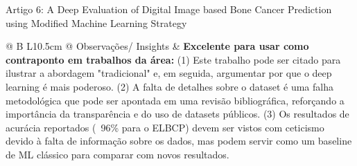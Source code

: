 \documentclass[12pt, a4paper]{article}
\begin{document}
\begin{fichabox}{Artigo 6: A Deep Evaluation of Digital Image based Bone Cancer Prediction using Modified Machine Learning Strategy}
\begin{longtable}{@{} B L{10.5cm} @{}}
    Observações/ Insights & \textbf{Excelente para usar como contraponto em trabalhos da área:} (1) Este trabalho pode ser citado para ilustrar a abordagem "tradicional" e, em seguida, argumentar por que o deep learning é mais poderoso. (2) A falta de detalhes sobre o dataset é uma falha metodológica que pode ser apontada em uma revisão bibliográfica, reforçando a importância da transparência e do uso de datasets públicos. (3) Os resultados de acurácia reportados (~96\% para o ELBCP) devem ser vistos com ceticismo devido à falta de informação sobre os dados, mas podem servir como um baseline de ML clássico para comparar com novos resultados. \\
    
    \bottomrule
\end{longtable}
\end{fichabox}
\end{document}

